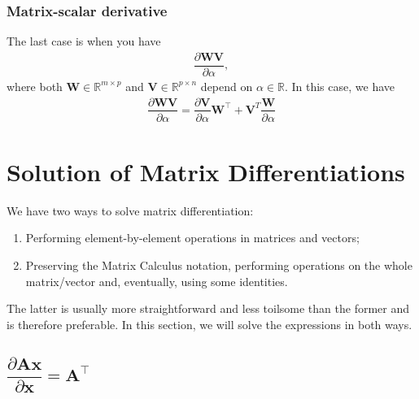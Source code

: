 \documentclass{article}
\newcommand{\trans}{\top}
\begin{document}
\subsubsection{Matrix-scalar derivative}
The last case is when you have
\begin{align}
    \dfrac{\partial \mathbf{W}\mathbf{V}}{\partial \alpha},
\end{align}
where both \(\mathbf{W} \in \mathbb{R}^{m \times p}\) and \(\mathbf{V} \in \mathbb{R}^{p\times n}\) depend on \(\alpha \in \mathbb{R}\). In this case, we have
\begin{align}
    \label{eq:matrix-matrix-product-rule}
    \dfrac{\partial \mathbf{W}\mathbf{V}}{\partial \alpha} = \dfrac{\partial \mathbf{V}}{\partial \alpha}\mathbf{W}^{\trans} + \mathbf{V}^{T} \dfrac{\mathbf{W}}{\partial \alpha}
\end{align}


\section{Solution of Matrix Differentiations}\label{sec:diff}
We have two ways to solve matrix differentiation:
\begin{enumerate}
    \item Performing element-by-element operations in matrices and vectors;
    \item Preserving the Matrix Calculus notation, performing operations on the whole matrix/vector and, eventually, using some identities.
\end{enumerate}
The latter is usually more straightforward and less toilsome than the former and is therefore preferable. In this section, we will solve the expressions in both ways.

\subsection{\(\dfrac{\partial \mathbf{A} \mathbf{x}}{\partial \mathbf{x}} = \mathbf{A}^\trans\)}
\end{document}
